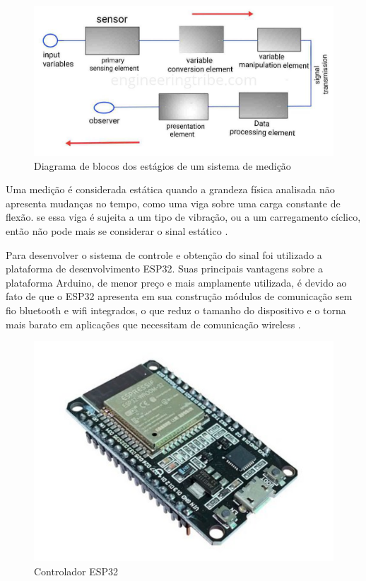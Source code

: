 \begin{figure}[htb]
	\caption{\label{fig:1130} Diagrama de blocos dos estágios de um sistema de medição}
	\begin{center}
		\includegraphics[width=\textwidth]{pictures/1130.jpg}
	\end{center}
\end{figure}

Uma medição é considerada estática quando a grandeza física analisada não apresenta mudanças no tempo, como uma viga sobre uma carga constante de flexão. se essa viga
é sujeita a um tipo de vibração, ou a um carregamento cíclico, então não pode mais se considerar o sinal estático \autocite{Hollman2011}.

Para desenvolver o sistema de controle e obtenção do sinal foi utilizado a plataforma de desenvolvimento ESP32. Suas principais vantagens sobre a plataforma Arduino, de menor
preço e mais amplamente utilizada, é devido ao fato de que o ESP32 apresenta em sua construção módulos de comunicação sem fio bluetooth e wifi integrados, o que reduz o tamanho
do dispositivo e o torna mais barato em aplicações que necessitam de comunicação wireless \autocite{DocsESP32}.

\begin{figure}[htb]
	\caption{\label{fig:1140} Controlador ESP32}
	\begin{center}
		\includegraphics[width=\textwidth]{pictures/1140.png}
	\end{center}
\end{figure}

